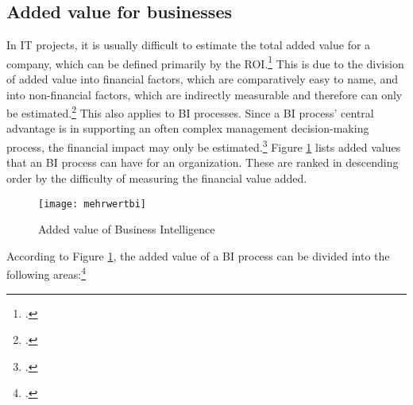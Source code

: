 \subsection{Added value for businesses} \label{toc:strategischermehrwert}

In IT projects, it is usually difficult to estimate the total added value for a company, which can be defined primarily by the
\ac{ROI}.\footcite[Cf.][p. 97]{hovcevar2010assessing} This is due to the division of added value
into financial factors, which are comparatively easy to name, and into non-financial factors, which are indirectly measurable
and therefore can only be estimated.\footcite[Cf.][p. 93]{hovcevar2010assessing} This also applies to \ac{BI} processes. Since a BI process' central advantage
is in supporting an often complex management decision-making process, the
financial impact may only be estimated.\footcite[Cf.][pp. 94]{hovcevar2010assessing} Figure
\ref{figure:mehrwertbi} lists added values that an \ac{BI} process can have for an organization. These are ranked in descending order
by the difficulty of measuring the financial value added.

\begin{figure}[H]
    \caption{Added value of Business Intelligence}
    \texttt{[image: mehrwertbi]}
    \label{figure:mehrwertbi}
    \\
    \cite[Source: Based on][Fig. 2]{watson2007current}
\end{figure}

According to Figure \ref{figure:mehrwertbi}, the added value of a BI process can be divided into the following areas:\footcite[Cf.][Fig. 2]{watson2007current}


